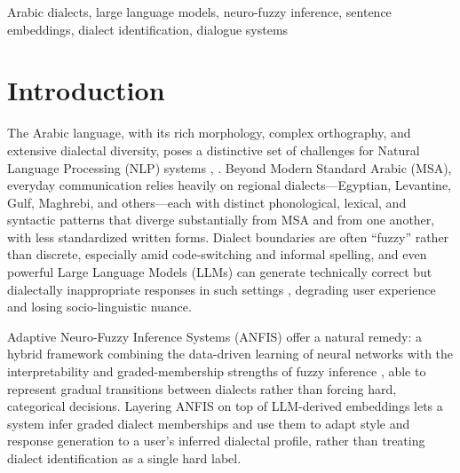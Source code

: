 \documentclass[conference]{IEEEtran}
\begin{document}
\begin{abstract}
not claim generalization to naturally occurring, topic-unmatched Arabic text, which is left to future work with an external corpus. Within this scope, the findings illustrate gradual transition zones between dialects that are more accurately represented by neuro-fuzzy membership than by rigid labels. This approach facilitates the development of context-aware, dialect-sensitive dialogue systems based on authentic conversational benchmarks.
\end{abstract}

\begin{IEEEkeywords}
Arabic dialects, large language models, neuro-fuzzy inference, sentence embeddings, dialect identification, dialogue systems
\end{IEEEkeywords}

\section{Introduction}
The Arabic language, with its rich morphology, complex orthography, and extensive dialectal diversity, poses a distinctive set of challenges for Natural Language Processing (NLP) systems \cite{habash2012}, \cite{elhaj2021}. Beyond Modern Standard Arabic (MSA), everyday communication relies heavily on regional dialects---Egyptian, Levantine, Gulf, Maghrebi, and others---each with distinct phonological, lexical, and syntactic patterns \cite{altwairesh2018} that diverge substantially from MSA and from one another, with less standardized written forms. Dialect boundaries are often ``fuzzy'' rather than discrete, especially amid code-switching and informal spelling, and even powerful Large Language Models (LLMs) can generate technically correct but dialectally inappropriate responses in such settings \cite{reimers2019}, degrading user experience and losing socio-linguistic nuance.

Adaptive Neuro-Fuzzy Inference Systems (ANFIS) offer a natural remedy: a hybrid framework combining the data-driven learning of neural networks with the interpretability and graded-membership strengths of fuzzy inference \cite{jang1993}, able to represent gradual transitions between dialects rather than forcing hard, categorical decisions. Layering ANFIS on top of LLM-derived embeddings lets a system infer graded dialect memberships and use them to adapt style and response generation to a user's inferred dialectal profile, rather than treating dialect identification as a single hard label.
\end{document}
